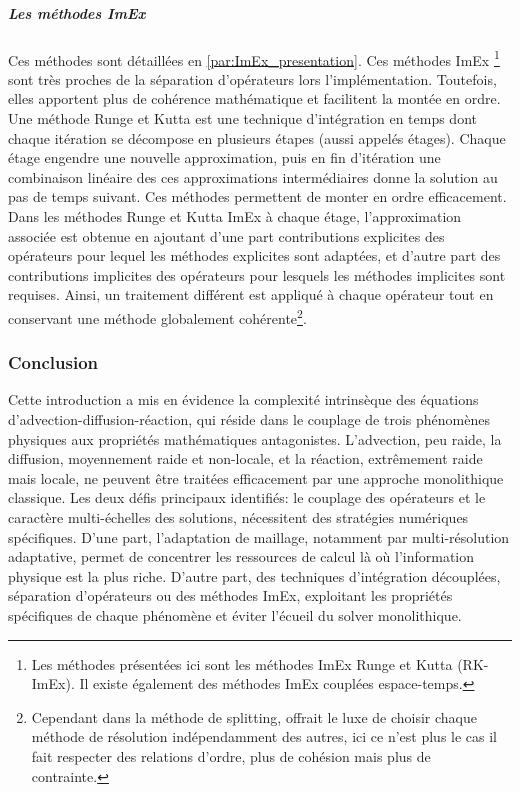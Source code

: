         \subparagraph{Les méthodes ImEx}
            Ces méthodes sont détaillées en \ref{par:ImEx_presentation}. Ces méthodes ImEx
            \footnote{Les méthodes présentées ici sont les méthodes ImEx Runge et Kutta (RK-ImEx). Il existe également des méthodes ImEx couplées espace-temps\cite{rebou2024}.}  \cite{pareschi2010implicitexplicitrungekuttaschemesapplications} \cite{KENNEDY2003139}
            sont très proches de la séparation d'opérateurs lors l'implémentation. Toutefois, elles apportent plus de cohérence mathématique
            et facilitent la montée en ordre. 
            Une méthode Runge et Kutta est une technique d'intégration en temps dont chaque itération se décompose en plusieurs étapes (aussi appelés étages).
            Chaque étage engendre une nouvelle approximation, puis en fin d'itération une combinaison linéaire des ces approximations intermédiaires donne la solution au pas de temps suivant.
            Ces méthodes permettent de monter en ordre efficacement.
            Dans les méthodes Runge et Kutta ImEx à chaque étage, l'approximation associée est obtenue en ajoutant d'une part contributions explicites des opérateurs pour lequel les méthodes explicites sont adaptées,
            et d'autre part des contributions implicites des opérateurs pour lesquels les méthodes implicites sont requises.
            Ainsi, un traitement différent est appliqué à chaque opérateur tout en conservant une méthode globalement cohérente\footnote{Cependant dans la méthode de splitting,
            offrait le luxe de choisir chaque méthode de résolution indépendamment des autres, ici ce n'est plus le cas il fait respecter des relations d'ordre,
            plus de cohésion mais plus de contrainte.}.

\subsubsection{Conclusion}
Cette introduction a mis en évidence la complexité intrinsèque des équations d'advection-diffusion-réaction, 
qui réside dans le couplage de trois phénomènes physiques aux propriétés mathématiques antagonistes. 
L'advection, peu raide, la diffusion, moyennement raide et non-locale, et la réaction, extrêmement raide mais locale, 
ne peuvent être traitées efficacement par une approche monolithique classique.
Les deux défis principaux identifiés: le couplage des opérateurs et le caractère multi-échelles des solutions, 
nécessitent des stratégies numériques spécifiques. 
D'une part, l'adaptation de maillage, notamment par multi-résolution adaptative, permet de concentrer les ressources de calcul là où l'information physique est la plus riche. 
D'autre part, des techniques d'intégration découplées, séparation d'opérateurs ou des méthodes ImEx, exploitant les propriétés spécifiques de chaque phénomène et éviter l'écueil du solver monolithique.
